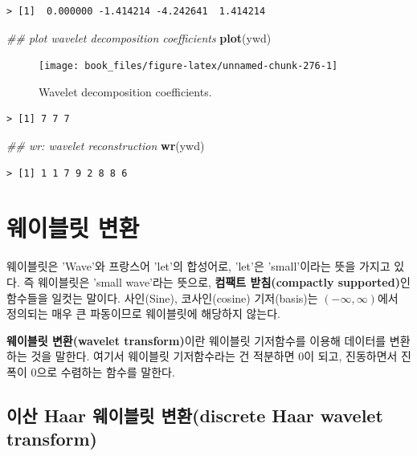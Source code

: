 \documentclass[b5paper,]{scrbook}
\makeatletter
\newenvironment{Shaded}{\begin{snugshade}}{\end{snugshade}}
\newcommand{\CommentTok}[1]{\textcolor[rgb]{0.56,0.35,0.01}{\textit{#1}}}
\newcommand{\KeywordTok}[1]{\textcolor[rgb]{0.13,0.29,0.53}{\textbf{#1}}}
\newcommand{\NormalTok}[1]{#1}
\theoremstyle{plain}
\theoremstyle{definition}
\numberwithin{equation}{section}
\newenvironment{kframe}{%
\medskip{}
\setlength{\fboxsep}{.8em}
 \def\at@end@of@kframe{}%
 \ifinner\ifhmode%
  \def\at@end@of@kframe{\end{minipage}}%
  \begin{minipage}{\columnwidth}%
 \fi\fi%
 \def\FrameCommand##1{\hskip\@totalleftmargin \hskip-\fboxsep
 \colorbox{shadecolor}{##1}\hskip-\fboxsep
     \hskip-\linewidth \hskip-\@totalleftmargin \hskip\columnwidth}%
 \MakeFramed {\advance\hsize-\width
   \@totalleftmargin\z@ \linewidth\hsize
   \@setminipage}}%
 {\par\unskip\endMakeFramed%
 \at@end@of@kframe}
\renewenvironment{Shaded}{\begin{kframe}}{\end{kframe}}
\makeatother
\begin{document}
\begin{verbatim}
> [1]  0.000000 -1.414214 -4.242641  1.414214
\end{verbatim}

\begin{Shaded}
\begin{Highlighting}[]
\CommentTok{## plot wavelet decomposition coefficients}
\KeywordTok{plot}\NormalTok{(ywd)}
\end{Highlighting}
\end{Shaded}

\begin{figure}

{\centering \texttt{[image: book\_files/figure-latex/unnamed-chunk-276-1]} 

}

\caption{Wavelet decomposition coefficients.}\label{fig:unnamed-chunk-276}
\end{figure}

\begin{verbatim}
> [1] 7 7 7
\end{verbatim}

\begin{Shaded}
\begin{Highlighting}[]
\CommentTok{## wr: wavelet reconstruction}
\KeywordTok{wr}\NormalTok{(ywd)}
\end{Highlighting}
\end{Shaded}

\begin{verbatim}
> [1] 1 1 7 9 2 8 8 6
\end{verbatim}

\hypertarget{wavelettransform}{%
\chapter{웨이블릿 변환}\label{wavelettransform}}

웨이블릿은 'Wave'와 프랑스어 'let'의 합성어로, 'let'은 'small'이라는 뜻을 가지고 있다. 즉 웨이블릿은 'small wave'라는 뜻으로, \textbf{컴팩트 받침(compactly supported)}인 함수들을 일컷는 말이다. 사인(Sine), 코사인(cosine) 기저(basis)는 \((-\infty, \infty)\)에서 정의되는 매우 큰 파동이므로 웨이블릿에 해당하지 않는다.

\textbf{웨이블릿 변환(wavelet transform)}이란 웨이블릿 기저함수를 이용해 데이터를 변환하는 것을 말한다. 여기서 웨이블릿 기저함수라는 건 적분하면 0이 되고, 진동하면서 진폭이 0으로 수렴하는 함수를 말한다.

\hypertarget{-haar--discrete-haar-wavelet-transform}{%
\section{이산 Haar 웨이블릿 변환(discrete Haar wavelet transform)}\label{-haar--discrete-haar-wavelet-transform}}
\end{document}
